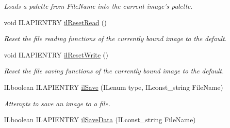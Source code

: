 \begin{DoxyCompactItemize}
\begin{DoxyCompactList}\small\item\em Loads a palette from File\+Name into the current image's palette. \end{DoxyCompactList}\item 
\hypertarget{group__file_gaad6da45dcc526f0b4d05c488c504b77b}{void I\+L\+A\+P\+I\+E\+N\+T\+R\+Y \hyperlink{group__file_gaad6da45dcc526f0b4d05c488c504b77b}{il\+Reset\+Read} ()}\label{group__file_gaad6da45dcc526f0b4d05c488c504b77b}

\begin{DoxyCompactList}\small\item\em Reset the file reading functions of the currently bound image to the default. \end{DoxyCompactList}\item 
\hypertarget{group__file_gac1f4f4a66b6ff3ae5a986b24cf2cd626}{void I\+L\+A\+P\+I\+E\+N\+T\+R\+Y \hyperlink{group__file_gac1f4f4a66b6ff3ae5a986b24cf2cd626}{il\+Reset\+Write} ()}\label{group__file_gac1f4f4a66b6ff3ae5a986b24cf2cd626}

\begin{DoxyCompactList}\small\item\em Reset the file saving functions of the currently bound image to the default. \end{DoxyCompactList}\item 
I\+Lboolean I\+L\+A\+P\+I\+E\+N\+T\+R\+Y \hyperlink{group__file_ga9defa198f10b426a91f1b764f0dc4a08}{il\+Save} (I\+Lenum type, I\+Lconst\+\_\+string File\+Name)
\begin{DoxyCompactList}\small\item\em Attempts to save an image to a file. \end{DoxyCompactList}\item 
\hypertarget{group__file_gabae3fa5c553904bd5ff5c7e6abc6b2c4}{I\+Lboolean I\+L\+A\+P\+I\+E\+N\+T\+R\+Y \hyperlink{group__file_gabae3fa5c553904bd5ff5c7e6abc6b2c4}{il\+Save\+Data} (I\+Lconst\+\_\+string File\+Name)}\label{group__file_gabae3fa5c553904bd5ff5c7e6abc6b2c4}


\end{DoxyCompactItemize}
